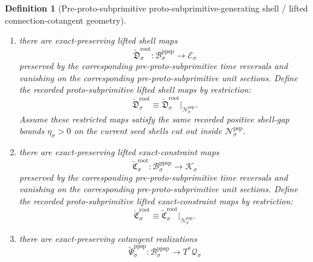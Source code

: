 \documentclass[11pt]{article}
\newcommand{\ConfigSpace}[1]{\mathcal Q_{#1}}
\newcommand{\ShellTarget}[1]{\mathcal E_{#1}}
\newcommand{\ShellGap}[1]{\eta_{#1}}
\newcommand{\ConstraintTarget}[1]{\mathcal K_{#1}}
\newcommand{\OriginGap}[1]{\epsilon_{#1}^{\mathrm{orig}}}
\newcommand{\ProtoSubprimSpace}[1]{\mathcal N_{#1}^{\mathrm{psp}}}
\newcommand{\ProtoSubprimLiftedAmbient}[1]{\check{\mathfrak S}_{#1}^{\mathrm{orig}}}
\newcommand{\ProtoSubprimLiftedShell}[1]{\check{\mathfrak D}_{#1}^{\mathrm{root}}}
\newcommand{\ProtoSubprimConstraintMap}[1]{\check{\mathfrak C}_{#1}^{\mathrm{root}}}
\newcommand{\PreProtoSubprimSpace}[1]{\mathcal B_{#1}^{\mathrm{ppsp}}}
\newcommand{\PreProtoSubprimLiftedAmbient}[1]{\widetilde{\mathfrak S}_{#1}^{\mathrm{orig}}}
\newcommand{\PreProtoSubprimLiftedShell}[1]{\widetilde{\mathfrak D}_{#1}^{\mathrm{root}}}
\newcommand{\PreProtoSubprimConstraintMap}[1]{\widetilde{\mathfrak C}_{#1}^{\mathrm{root}}}
\newcommand{\PreProtoSubprimCotangentRealization}[1]{\widetilde{\Psi}_{#1}^{\mathrm{ppsp}}}
\newtheorem{definition}{Definition}
\begin{document}
\begin{definition}[Pre-proto-subprimitive proto-subprimitive-generating shell / lifted connection-cotangent geometry]
\begin{enumerate}
\[    \]
    preserved by the corresponding pre-proto-subprimitive time reversals and vanishing on the corresponding pre-proto-subprimitive unit sections. Define the recorded proto-subprimitive lifted ambient-generating shell maps by restriction:
    \begin{equation}
    \ProtoSubprimLiftedAmbient{\sigma}\equiv \PreProtoSubprimLiftedAmbient{\sigma}|_{\ProtoSubprimSpace{\sigma}}.
    \label{eq:protosubprimitive_ambient_from_preprotosubprimitive}
    \end{equation}
    Assume these restricted maps satisfy the same recorded positive ambient-generating gap bounds \(\OriginGap{\sigma}>0\) on the current ambient shells cut out inside \(\ProtoSubprimSpace{\sigma}\).
    \item there are exact-preserving lifted shell maps
    \[
    \PreProtoSubprimLiftedShell{\sigma}:\PreProtoSubprimSpace{\sigma}\to\ShellTarget{\sigma}
    \]
    preserved by the corresponding pre-proto-subprimitive time reversals and vanishing on the corresponding pre-proto-subprimitive unit sections. Define the recorded proto-subprimitive lifted shell maps by restriction:
    \begin{equation}
    \ProtoSubprimLiftedShell{\sigma}\equiv \PreProtoSubprimLiftedShell{\sigma}|_{\ProtoSubprimSpace{\sigma}}.
    \label{eq:protosubprimitive_shell_map_from_preprotosubprimitive}
    \end{equation}
    Assume these restricted maps satisfy the same recorded positive shell-gap bounds \(\ShellGap{\sigma}>0\) on the current seed shells cut out inside \(\ProtoSubprimSpace{\sigma}\).
    \item there are exact-preserving lifted exact-constraint maps
    \[
    \PreProtoSubprimConstraintMap{\sigma}:\PreProtoSubprimSpace{\sigma}\to\ConstraintTarget{\sigma}
    \]
    preserved by the corresponding pre-proto-subprimitive time reversals and vanishing on the corresponding pre-proto-subprimitive unit sections. Define the recorded proto-subprimitive lifted exact-constraint maps by restriction:
    \begin{equation}
    \ProtoSubprimConstraintMap{\sigma}\equiv \PreProtoSubprimConstraintMap{\sigma}|_{\ProtoSubprimSpace{\sigma}}.
    \label{eq:protosubprimitive_constraint_from_preprotosubprimitive}
    \end{equation}
    \item there are exact-preserving cotangent realizations
    \[
    \PreProtoSubprimCotangentRealization{\sigma}:\PreProtoSubprimSpace{\sigma}\to T^*\ConfigSpace{\sigma}
\]
\end{enumerate}
\end{definition}
\end{document}
